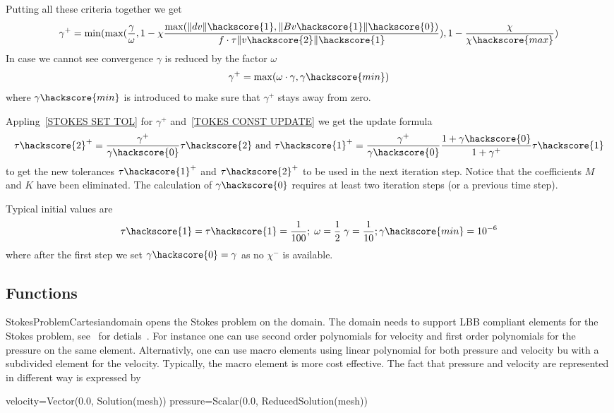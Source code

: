 Putting all these criteria together we get
\begin{equation}
\gamma^{+}=\min(\max(
\frac{\gamma}{\omega},
1 - 
\chi \frac{\max(\|dv\|\hackscore{1}, \|Bv\hackscore{1}\|\hackscore{0})} { f \cdot \tau \|v\hackscore{2}\|\hackscore{1}}), 1 - \frac{\chi}{\chi\hackscore{max}})
\label{STOKES SET GAMMA PLUS}
\end{equation}
In case we cannot see convergence $\gamma$ is reduced by the factor $\omega$
\begin{equation}
\gamma^{+}=\max(\omega \cdot \gamma, \gamma\hackscore{min})\label{STOKES SET GAMMA PLUS2}
\end{equation}
where $\gamma\hackscore{min}$ is introduced to make sure that $\gamma^{+}$ stays away from zero. 


Appling~\ref{STOKES SET TOL} for $\gamma^{+}$ and~\ref{TOKES CONST UPDATE} we get the update formula 
\begin{equation} \label{STOKES CONST UPDATE}
\tau\hackscore{2}^{+} = 
\frac{\gamma^{+}}{\gamma\hackscore{0}} \tau\hackscore{2}
\mbox{ and } \tau\hackscore{1}^{+} = 
\frac{\gamma^{+}}{\gamma\hackscore{0}}
\frac{1+\gamma\hackscore{0}}{1+\gamma^{+}}
\tau\hackscore{1}
\end{equation}
to get the new tolerances $\tau\hackscore{1}^{+}$ and $\tau\hackscore{2}^{+}$ to be used in the next iteration step.
Notice that the coefficients $M$ and $K$ have been eliminated. The calculation of $\gamma\hackscore{0}$ requires 
at least two iteration steps (or a previous time step). 

Typical initial values are
\begin{equation} \label{STOKES VALUES}
\tau\hackscore{1}=\tau\hackscore{1}=\frac{1}{100} ; \; \omega=\frac{1}{2} \; \gamma=\frac{1}{10} ;\gamma\hackscore{min}=10^{-6}
\end{equation}
where after the first step we set $\gamma\hackscore{0}=\gamma$ as no $\chi^{-}$ is available.


\subsection{Functions}

\begin{classdesc}{StokesProblemCartesian}{domain}
opens the Stokes problem on the \Domain domain. The domain
needs to support LBB compliant elements for the Stokes problem, see~\cite{LBB} for detials~.
For instance one can use second order polynomials for velocity and 
first order polynomials for the pressure on the same element. Alternativly, one can use 
macro elements using linear polynomial for both pressure and velocity bu with a subdivided
element for the velocity. Typically, the macro element is more cost effective. The fact that pressure and velocity are represented in different way is expressed by
\begin{python}
velocity=Vector(0.0, Solution(mesh))
pressure=Scalar(0.0, ReducedSolution(mesh))
\end{python}
\end{classdesc}

